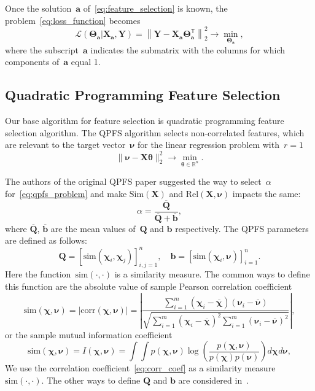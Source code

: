 \documentclass[12pt,oneside]{article}
\theoremstyle{definition}
\newcommand{\ba}{\mathbf{a}}
\newcommand{\bb}{\mathbf{b}}
\newcommand{\bY}{\mathbf{Y}}
\newcommand{\bX}{\mathbf{X}}
\newcommand{\bQ}{\mathbf{Q}}
\newcommand{\bbR}{\mathbb{R}}
\newcommand{\T}{\mathsf{T}}
\newcommand{\bchi}{\boldsymbol{\chi}}
\newcommand{\bnu}{\boldsymbol{\nu}}
\newcommand{\btheta}{\boldsymbol{\theta}}
\newcommand{\bTheta}{\boldsymbol{\Theta}}
\begin{document}
Once the solution~$\ba$ of~\eqref{eq:feature_selection} is known, the problem~\eqref{eq:loss_function} becomes
\begin{equation}
\mathcal{L}(\bTheta_{\ba} | \bX_{\ba}, \bY) = {\left\| \mathbf{Y} - \bX_{\ba}\bTheta^{\T}_{\ba} \right\| }_2^2 \rightarrow\min_{\bTheta_{\ba}},
\end{equation}
where the subscript~$\ba$ indicates the submatrix with the columns for which components of~$\ba$ equal 1.

\subsection{Quadratic Programming Feature Selection}
Our base algorithm for feature selection is quadratic programming feature selection algorithm. 
The QPFS algorithm selects non-correlated features, which are relevant to the target vector~$\bnu$ for the linear regression problem with~$r=1$
\begin{equation}
	\| \bnu - \bX \btheta\|_2^2 \rightarrow\min_{\btheta \in \bbR^{n}}.
\end{equation}

The authors of the original QPFS paper suggested the way to select~$\alpha$ for~\ref{eq:qpfs_problem} and make $\text{Sim}(\bX)$ and $\text{Rel}(\bX, \bnu)$ impacts the same:
\begin{equation}
	\alpha = \frac{\overline{\bQ}}{\overline{\bQ} + \overline{\bb}},
\end{equation}
where $\overline{\bQ}$, $\overline{\bb}$ are the mean values of~$\bQ$ and $\bb$ respectively. The QPFS parameters are defined as follows:
\begin{equation}
	\bQ = \left[\text{sim}(\bchi_i, \bchi_j)\right]_{i,j=1}^n, \quad \bb = \left[\text{sim}(\bchi_i, \bnu)\right]_{i=1}^n.
	\label{eq:qpfs_1d_qb}
\end{equation}
Here the function~$\text{sim}(\cdot, \cdot)$ is a similarity measure.
The common ways to define this function are the absolute value of sample Pearson correlation coefficient
\begin{equation}
	\text{sim}(\bchi, \bnu) = |\text{corr}(\bchi, \bnu)| = \left|\frac{\sum_{i=1}^m(\bchi_i - \overline{\bchi})( \bnu_i - \overline{\bnu})}{\sqrt{\sum_{i=1}^m(\bchi_i - \overline{\bchi})^2\sum_{i=1}^m(\bnu_i - \overline{\bnu})^2}}\right|,
	\label{eq:corr_coef}
\end{equation}
or the sample mutual information coefficient
\begin{equation}
\text{sim}(\bchi, \bnu) = I(\bchi, \bnu) = \int \int p(\bchi, \bnu) \log(\frac{p(\bchi, \bnu)}{p(\bchi)p(\bnu)}) d\bchi d\bnu,
\end{equation}
We use the correlation coefficient~\eqref{eq:corr_coef} as a similarity measure~$\text{sim}(\cdot, \cdot)$.
The other ways to define $\bQ$ and $\bb$ are considered in~\cite{katrutsa2017comprehensive}.
\end{document}
